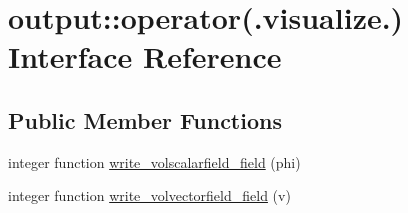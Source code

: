 \hypertarget{interfaceoutput_1_1operator_07_8visualize_8_08}{\section{output\-:\-:operator(.visualize.) Interface Reference}
\label{interfaceoutput_1_1operator_07_8visualize_8_08}
}
\subsection*{Public Member Functions}
\begin{DoxyCompactItemize}
\item 
integer function \hyperlink{interfaceoutput_1_1operator_07_8visualize_8_08_a48a6f99f93f355833ad37e4d0bf7d97f}{write\-\_\-volscalarfield\-\_\-field} (phi)
\item 
integer function \hyperlink{interfaceoutput_1_1operator_07_8visualize_8_08_aa6395b35e6af64c85614053109aaa5aa}{write\-\_\-volvectorfield\-\_\-field} (v)
\end{DoxyCompactItemize}


